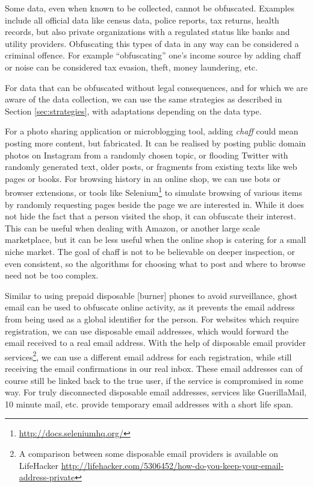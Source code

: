 \documentclass{IOS-Book-Article}     %
\newcommand{\tbox}[3][red]{{
\color{#1}\noindent{
   \fbox{\scriptsize{ {\bf #2} \textsl{#3}}}
   \vspace{2pt}
}
}}
\newcommand{\todo}[1]{\tbox{TODO:}{#1}}
\begin{document}
Some data, even when known to be collected, cannot be obfuscated. Examples 
include all official data like census data, police reports, tax returns, health 
records, but also private organizations with a regulated status like banks and 
utility providers. Obfuscating this types of data in any way can be considered 
a criminal offence. 
For example ``obfuscating'' one's income source by adding chaff or noise can be 
considered tax evasion, theft, money laundering, etc.

For data that can be obfuscated without legal consequences, and for 
which we are aware of the data collection, we can use the same 
strategies as described in Section \ref{sec:strategies}, with adaptations 
depending on the data type. 

For a photo sharing application or microblogging tool, adding \emph{chaff} 
could mean posting more content, but fabricated. 
It can be realised by posting public domain photos on Instagram from a randomly 
chosen topic, or flooding Twitter with randomly generated text, older posts, or 
fragments from existing texts like web pages or books. For browsing history in 
an online shop, we can use bots or browser extensions, or tools like Selenium\footnote{\url{http://docs.seleniumhq.org/}}
to simulate browsing of various items by randomly requesting 
pages beside the page we are interested in. While it does 
not hide the fact that a person visited the shop, it can obfuscate their interest. 
This can be useful when dealing with Amazon, or another large scale marketplace, 
but it can be less useful when the online shop is catering for a small niche 
market. 
The goal of chaff is not to be believable on deeper inspection, or even 
consistent, so the algorithms for choosing what to post and where to browse 
need not be too complex. 

Similar to using prepaid disposable [burner] phones to avoid surveillance, 
ghost email can be used to obfuscate online activity, as it prevents the email 
address from being used as a global identifier for the person. For websites which 
require registration, we can use disposable email addresses, which would 
forward the email received to a real email address. With 
the help of disposable email provider services\footnote{A comparison between 
some disposable email providers is available on LifeHacker 
\url{http://lifehacker.com/5306452/how-do-you-keep-your-email-address-private}}, 
we can use a different email address for each registration, while still 
receiving the email confirmations in our real inbox. These email addresses can 
of course still be linked back to the true user, if the service is compromised 
in some way. For truly disconnected disposable email addresses, services like 
GuerillaMail, 10 minute mail, etc. provide temporary email addresses with a 
short life span. 
\end{document}
